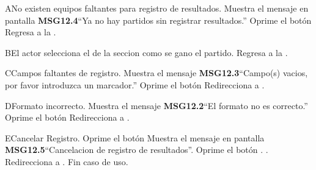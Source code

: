 	\begin{UCtrayectoriaA}{A}{No existen equipos faltantes para registro de resultados.}
		\UCpaso Muestra el mensaje en pantalla {\bf MSG12.4}``Ya no hay partidos sin registrar resultados.''
		\UCpaso[\UCactor] Oprime el botón 
		\UCpaso Regresa a la .
	\end{UCtrayectoriaA}
	
	\begin{UCtrayectoriaA}{B}{El actor selecciona el  de la seccion como se gano el partido.}
		\UCpaso Regresa a la .
	\end{UCtrayectoriaA}	
	
	\begin{UCtrayectoriaA}{C}{Campos faltantes de registro.}
		\UCpaso Muestra el mensaje {\bf MSG12.3}``Campo(s) vacios, por favor introduzca un marcador.''
		\UCpaso[\UCactor] Oprime el botón 
		\UCpaso Redirecciona a .
	\end{UCtrayectoriaA}
	
	\begin{UCtrayectoriaA}{D}{Formato incorrecto.}
		\UCpaso Muestra el mensaje {\bf MSG12.2}``El formato no es correcto.''
		\UCpaso[\UCactor] Oprime el botón 
		\UCpaso Redirecciona a .
	\end{UCtrayectoriaA}
	
	\begin{UCtrayectoriaA}{E}{Cancelar Registro.}
		\UCpaso[\UCactor] Oprime el botón 
		\UCpaso Muestra el mensaje en pantalla {\bf MSG12.5}``Cancelacion de registro de resultados''.
		\UCpaso[\UCactor] Oprime el botón . .
		\UCpaso Redirecciona a .
		\UCpaso Fin caso de uso.
	\end{UCtrayectoriaA}
